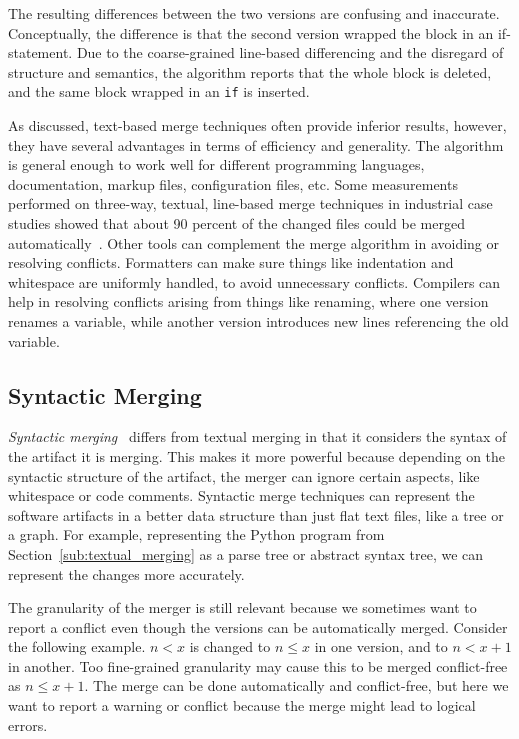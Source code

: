 \documentclass[a4paper,english]{ifimaster}
\begin{document}
The resulting differences between the two versions are confusing and inaccurate. Conceptually, the difference is that the second version wrapped the block in an if-statement. Due to the coarse-grained line-based differencing and the disregard of structure and semantics, the algorithm reports that the whole block is deleted, and the same block wrapped in an \texttt{if} is inserted.

As discussed, text-based merge techniques often provide inferior results, however, they have several advantages in terms of efficiency and generality. The algorithm is general enough to work well for different programming languages, documentation, markup files, configuration files, etc. Some measurements performed on three-way, textual, line-based merge techniques in industrial case studies showed that about 90 percent of the changed files could be merged automatically~\cite{cite:large_scale_case_study}. Other tools can complement the merge algorithm in avoiding or resolving conflicts. Formatters can make sure things like indentation and whitespace are uniformly handled, to avoid unnecessary conflicts. Compilers can help in resolving conflicts arising from things like renaming, where one version renames a variable, while another version introduces new lines referencing the old variable.

\subsection{Syntactic Merging}%
\label{sub:syntactic_merging}

\textit{Syntactic merging}~\cite{cite:syntactic_software_merging} differs from textual merging in that it considers the syntax of the artifact it is merging. This makes it more powerful because depending on the syntactic structure of the artifact, the merger can ignore certain aspects, like whitespace or code comments. Syntactic merge techniques can represent the software artifacts in a better data structure than just flat text files, like a tree or a graph. For example, representing the Python program from Section~\vref{sub:textual_merging} as a parse tree or abstract syntax tree, we can represent the changes more accurately.

The granularity of the merger is still relevant because we sometimes want to report a conflict even though the versions can be automatically merged. Consider the following example. $n < x$ is changed to $n \leq x$ in one version, and to $n < x + 1$ in another. Too fine-grained granularity may cause this to be merged conflict-free as $n \leq x + 1$. The merge can be done automatically and conflict-free, but here we want to report a warning or conflict because the merge might lead to logical errors.
\end{document}
